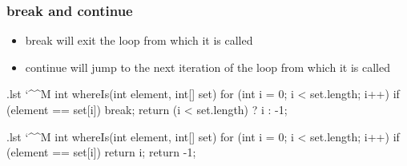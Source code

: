 \documentclass[10pt,handout]{beamer}
\makeatletter
\newenvironment{code}{%
  \begingroup
  \@bsphack
  \immediate\openout\lstvrb@out\jobname.lst
  \let\do\@makeother\dospecials\catcode`\^^M\active
  \def\verbatim@processline{%
    \immediate\write\lstvrb@out{\the\verbatim@line}}%
  \verbatim@start}{%
  \immediate\closeout\lstvrb@out
  \@esphack
  \endgroup
  
  \begin{alertblock}{}
    
  \end{alertblock}}
\makeatother
\begin{document}
\begin{frame}[fragile]
\frametitle{break and continue}
\begin{itemize}
   \item break will exit the loop from which it is called
   \item continue will jump to the next iteration of the loop from which it is called
\end{itemize}

\begin{code}
int whereIs(int element, int[] set) {
  for (int i = 0; i < set.length; i++) {
    if (element == set[i]) {
      break;
    } 
  }
  return (i < set.length) ? i : -1; 
}
\end{code}
\end{frame}

\begin{frame}[fragile]
\begin{code}
int whereIs(int element, int[] set) {
  for (int i = 0; i < set.length; i++) {
    if (element == set[i]) {
      return i;
    } 
  }
  return -1;
}
\end{code}

\end{frame}

\end{document}
